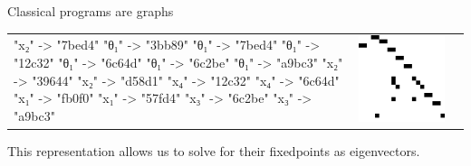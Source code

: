 \documentclass{beamer}
\begin{document}
\begin{frame}[fragile]{Classical programs are graphs}
\begin{table}[H]
\begin{tabular}{lcc}
\begin{adjustbox}{minipage={.25\textwidth}, height=0.14\textwidth, margin*=0cm 0cm 0cm 0.1cm}
{    "x₂" -> "7bed4"
    "θ₁" -> "3bb89"
    "θ₁" -> "7bed4"
    "θ₁" -> "12c32"
    "θ₁" -> "6c64d"
    "θ₁" -> "6c2be"
    "θ₁" -> "a9bc3"
    "x₂" -> "39644"
    "x₂" -> "d58d1"
    "x₄" -> "12c32"
    "x₄" -> "6c64d"
    "x₁" -> "fb0f0"
    "x₁" -> "57fd4"
    "x₃" -> "6c2be"
    "x₃" -> "a9bc3"
    } \end{adjustbox} &
            \begin{adjustbox}{minipage={.15\textwidth}, height=0.14\textwidth, margin*=-0.2cm 0cm 0cm 0.5cm}
            \includegraphics[scale=0.15]{../figures/adj_prog.png}
            \end{adjustbox}
        \end{tabular}
    \end{table}
        This representation allows us to solve for their fixedpoints as eigenvectors.
    \end{frame}
\end{document}
